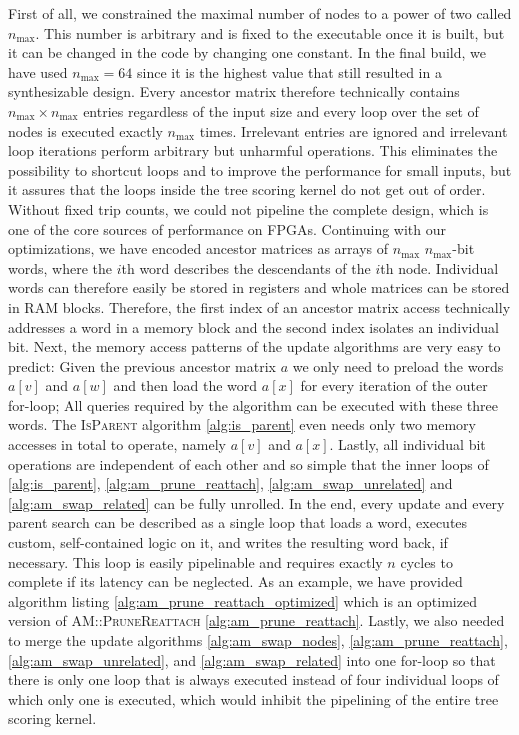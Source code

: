 First of all, we constrained the maximal number of nodes to a power of two called $n_\mathrm{max}$. This number is arbitrary and is fixed to the executable once it is built, but it can be changed in the code by changing one constant. In the final build, we have used $n_\mathrm{max} = 64$ since it is the highest value that still resulted in a synthesizable design. Every ancestor matrix therefore technically contains $n_\mathrm{max} \times n_\mathrm{max}$ entries regardless of the input size and every loop over the set of nodes is executed exactly $n_\mathrm{max}$ times. Irrelevant entries are ignored and irrelevant loop iterations perform arbitrary but unharmful operations. This eliminates the possibility to shortcut loops and to improve the performance for small inputs, but it assures that the loops inside the tree scoring kernel do not get out of order. Without fixed trip counts, we could not pipeline the complete design, which is one of the core sources of performance on \acp{FPGA}. Continuing with our optimizations, we have encoded ancestor matrices as arrays of $n_\mathrm{max}$ $n_\mathrm{max}$-bit words, where the $i$th word describes the descendants of the $i$th node. Individual words can therefore easily be stored in registers and whole matrices can be stored in \ac{RAM} blocks. Therefore, the first index of an ancestor matrix access technically addresses a word in a memory block and the second index isolates an individual bit. Next, the memory access patterns of the update algorithms are very easy to predict: Given the previous ancestor matrix $a$ we only need to preload the words $a[v]$ and $a[w]$ and then load the word $a[x]$ for every iteration of the outer for-loop; All queries required by the algorithm can be executed with these three words. The \textsc{IsParent} algorithm \ref{alg:is_parent} even needs only two memory accesses in total to operate, namely $a[v]$ and $a[x]$. Lastly, all individual bit operations are independent of each other and so simple that the inner loops of \ref{alg:is_parent}, \ref{alg:am_prune_reattach}, \ref{alg:am_swap_unrelated} and \ref{alg:am_swap_related} can be fully unrolled. In the end, every update and every parent search can be described as a single loop that loads a word, executes custom, self-contained logic on it, and writes the resulting word back, if necessary. This loop is easily pipelinable and requires exactly $n$ cycles to complete if its latency can be neglected. As an example, we have provided algorithm listing \ref{alg:am_prune_reattach_optimized} which is an optimized version of \textsc{AM::PruneReattach} \ref{alg:am_prune_reattach}. Lastly, we also needed to merge the update algorithms \ref{alg:am_swap_nodes}, \ref{alg:am_prune_reattach}, \ref{alg:am_swap_unrelated}, and \ref{alg:am_swap_related} into one for-loop so that there is only one loop that is always executed instead of four individual loops of which only one is executed, which would inhibit the pipelining of the entire tree scoring kernel.

